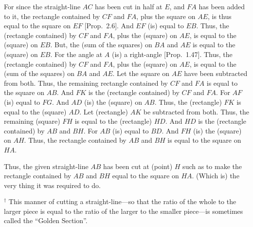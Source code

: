 \begin{Parallel}{}{}
{For since the straight-line $AC$ has been cut in half at $E$, and $FA$ has been
added to it, the rectangle contained by $CF$ and $FA$, plus the square on $AE$, is
thus equal to the square on $EF$ [Prop.~2.6]. And $EF$ (is) equal to $EB$. Thus,
the (rectangle contained) by $CF$ and $FA$, plus the (square) on $AE$, is equal
to the (square) on $EB$. But, the (sum of the squares) on $BA$ and $AE$ is equal
to the (square) on $EB$. For the angle at $A$ (is) a right-angle [Prop.~1.47].
Thus, the (rectangle contained) by $CF$ and $FA$, plus the (square) on $AE$,
is equal to the (sum of the squares) on $BA$ and $AE$. Let the square on $AE$ have
been subtracted from both. Thus, the remaining rectangle contained by
$CF$ and $FA$ is equal to the square on $AB$.  And $FK$ is the (rectangle contained)
by $CF$ and $FA$. For $AF$ (is) equal to $FG$. And $AD$ (is) the (square) on $AB$. Thus, the
(rectangle) $FK$ is equal to the (square) $AD$. Let (rectangle) $AK$ be
subtracted from both. Thus, the remaining (square) $FH$ is equal to 
the (rectangle) $HD$. And  $HD$ is the (rectangle contained) by $AB$ and $BH$.
For $AB$ (is) equal to $BD$. And $FH$ (is) the (square) on $AH$.
Thus, the rectangle contained by $AB$ and $BH$ is equal to the square on $HA$.

Thus, the given straight-line $AB$ has been cut at (point) $H$ such as to make
the rectangle contained by $AB$ and $BH$ equal to the square on $HA$.
(Which is) the very thing it was required to do.
}
\end{Parallel}
{\footnotesize \noindent$^\dag$ This manner of cutting a straight-line---so
that the ratio of the whole to the larger piece is equal to the ratio
of the larger to the smaller piece---is sometimes called the ``Golden Section''.}

